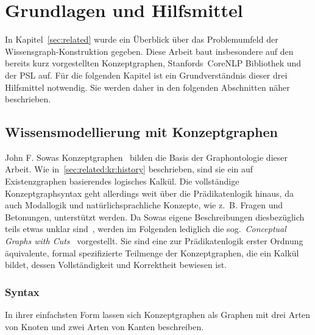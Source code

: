 \def\cgCutScale{0.23}

\chapter{Grundlagen und Hilfsmittel}%
\label{sec:theory}

In Kapitel~\ref{sec:related} wurde ein Überblick über das Problemumfeld der Wissensgraph-Konstruk\-tion gegeben.
Diese Arbeit baut insbesondere auf den bereits kurz vorgestellten Konzeptgraphen, Stanfords~CoreNLP Bibliothek und der PSL auf.
Für die folgenden Kapitel ist ein Grundverständnis dieser drei Hilfsmittel notwendig.
Sie werden daher in den folgenden Abschnitten näher beschrieben.

\section{Wissensmodellierung mit Konzeptgraphen}%
\label{sec:theory:cg}

John F. Sowas Konzeptgraphen~\cite{Harmelen2007} bilden die Basis der Graphontologie dieser Arbeit.
Wie in~\ref{sec:related:kr:history} beschrieben, sind sie ein auf Existenzgraphen basierendes logisches Kalkül.
Die vollständige Konzeptgraphsyntax geht allerdings weit über die Prädikatenlogik hinaus, da auch Modallogik und natürlichsprachliche Konzepte, wie z.~B. Fragen und Betonungen, unterstützt werden.
Da Sowas eigene Beschreibungen diesbezüglich teils etwas unklar sind~\cite{Wermelinger1995}, werden im Folgenden lediglich die sog.~\textit{Conceptual Graphs with Cuts}~\cite{Dau2003} vorgestellt.
Sie sind eine zur Prädikatenlogik erster Ordnung äquivalente, formal spezifizierte Teilmenge der Konzeptgraphen, die ein Kalkül bildet, dessen Vollständigkeit und Korrektheit bewiesen ist.

\subsection{Syntax}%
\label{sec:theory:cg:syntax}

In ihrer einfachsten Form lassen sich Konzeptgraphen als Graphen mit drei Arten von Knoten und zwei Arten von Kanten beschreiben.

